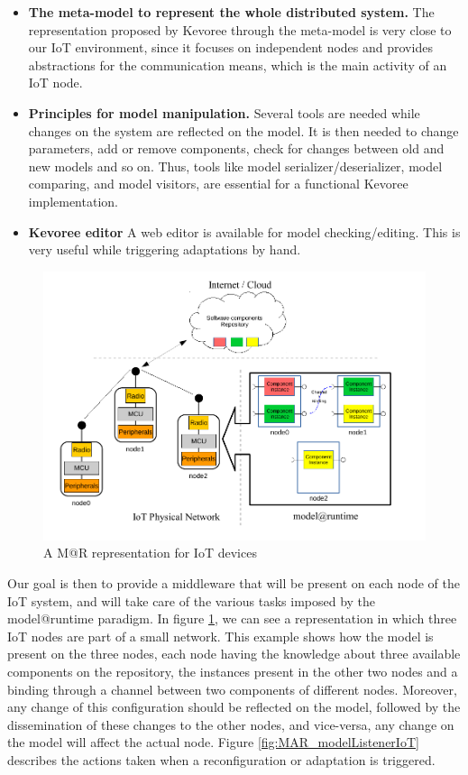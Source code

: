 \begin{itemize}
	\item \textbf{The meta-model to represent the whole distributed system.} The representation proposed by Kevoree through the meta-model is very close to our IoT environment, since it focuses on independent nodes and provides abstractions for the communication means, which is the main activity of an IoT node.
	\item \textbf{Principles for model manipulation.} Several tools are needed while changes on the system are reflected on the model. It is then needed to change parameters, add or remove components, check for changes between old and new models and so on. Thus, tools like model serializer/deserializer, model comparing, and model visitors, are essential for a functional Kevoree implementation.
	\item \textbf{Kevoree editor} A web editor is available for model checking/editing. This is very useful while triggering adaptations by hand.
\end{itemize}
\begin{figure}[]
	\centering
	\includegraphics[width=1\columnwidth]{chapters/modelsAtRuntimeIoT.images/MAR_IOT.pdf}
	\caption{A M@R representation for IoT devices}
	\label{fig:MAR_IOT}
\end{figure}
Our goal is then to provide a middleware that will be present on each node of the IoT system, and will take care of the various tasks imposed by the model@runtime paradigm.
In figure \ref{fig:MAR_IOT}, we can see a representation in which three IoT nodes are part of a small network.
This example shows how the model is present on the three nodes, each node having the knowledge about three available components on the repository, the instances present in the other two nodes and a binding through a channel between two components of different nodes.
Moreover, any change of this configuration should be reflected on the model, followed by the dissemination of these changes to the other nodes, and vice-versa, any change on the model will affect the actual node.
Figure \ref{fig:MAR_modelListenerIoT} describes the actions taken when a reconfiguration or adaptation is triggered.

